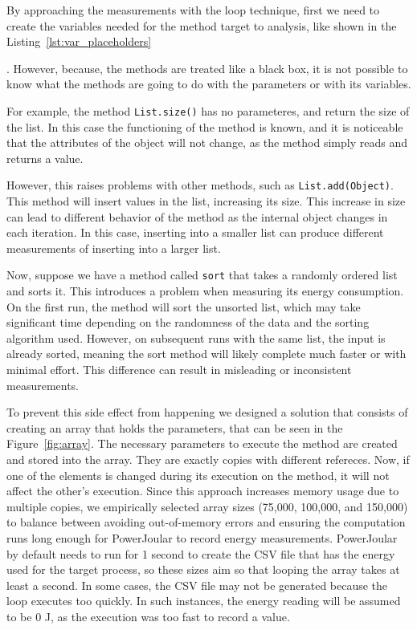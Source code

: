 By approaching the measurements with the loop technique, first we need to create the variables needed for the method target to analysis, like shown in the Listing~\ref{lst:var_placeholders} \begin{comment}\wo{dê exemplos}\end{comment}. However, because, the methods are treated like a black box, it is not possible to know what the methods are going to do with the parameters or with its variables. {\color{blue} For example, the method \texttt{List.size()} has no parameteres, and return the size of the list. In this case the functioning of the method is known, and it is noticeable that the attributes of the object will not change, as the method simply reads and returns a value.

However, this raises problems with other methods, such as \texttt{List.add(Object)}. This method will insert values in the list, increasing its size. This increase in size can lead to different behavior of the method as the internal object changes in each iteration. In this case, inserting into a smaller list can produce different measurements of inserting into a larger list.}

Now, suppose we have a method called \texttt{sort} that takes a randomly ordered list and sorts it. This introduces a problem when measuring its energy consumption. On the first run, the method will sort the unsorted list, which may take significant time depending on the randomness of the data and the sorting algorithm used. However, on subsequent runs with the same list, the input is already sorted, meaning the sort method will likely complete much faster or with minimal effort. This difference can result in misleading or inconsistent measurements.

To prevent this side effect from happening we designed a solution that consists of creating an array that holds the parameters, that can be seen in the Figure~\ref{fig:array}. The necessary parameters to execute the method are created and stored into the array. They are exactly copies with different refereces. Now, if one of the elements is changed during its execution on the method, it will not affect the other's execution. Since this approach increases memory usage due to multiple copies, we empirically selected array sizes (75,000, 100,000, and 150,000) to balance between avoiding out-of-memory errors and ensuring the computation runs long enough for PowerJoular to record energy measurements. PowerJoular by default needs to run for 1 second to create the CSV file that has the energy used for the target process, so these sizes aim so that looping the array takes at least a second. In some cases, the CSV file may not be generated because the loop executes too quickly. In such instances, the energy reading will be assumed to be 0 J, as the execution was too fast to record a value.


